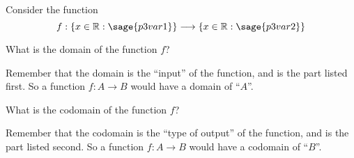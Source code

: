 \documentclass{ximera}
\begin{document}
\begin{problem}
    Consider the function 
    \[
        f:\{ x \in \mathbb{R} : \sage{p3var1} \} \longrightarrow \{ x \in \mathbb{R} : \sage{p3var2} \}
    \]
    
    What is the domain of the function $f$?
    \begin{multipleChoice}
    \end{multipleChoice}
    
    \begin{feedback}
        Remember that the domain is the ``input'' of the function, and is the part listed first. So a function $f:A\rightarrow B$ would have a domain of ``$A$''.
    \end{feedback}    
    
    What is the codomain of the function $f$?
    
    \begin{multipleChoice}
    \end{multipleChoice}
    
    \begin{feedback}
        Remember that the codomain is the ``type of output'' of the function, and is the part listed second. So a function $f:A\rightarrow B$ would have a codomain of ``$B$''.
    \end{feedback}    
\end{problem}
\end{document}
